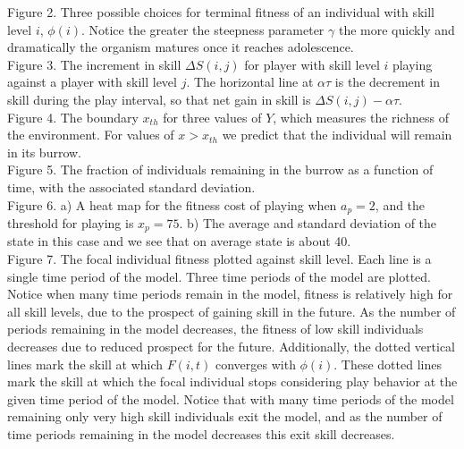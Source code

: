 \documentclass[12pt, letterpaper, fleqn]{article}
\begin{document}
%
%

%
Figure 2.
%
Three possible choices for terminal fitness of an individual with skill level $i$,  $\phi(i)$. 
%
Notice the greater the steepness parameter $\gamma$ the more quickly and dramatically the organism matures once it reaches adolescence. 
\\

%
%

%
Figure 3.
%
The increment in skill  $\Delta S(i,j)$ for player with skill level $i$ playing against a player with skill level $j$. 
%
The horizontal line at $\alpha \tau$ is the decrement in skill during the play interval, so that net gain in skill is $\Delta S(i,j) - \alpha \tau$.
\\

%
%

%
Figure 4.  
%
The boundary $x_{th}$ for three values of $Y$, which measures the richness of the environment.  
%
For values of $x>x_{th}$ we predict that the individual will remain in its burrow.
\\

%
%

%
Figure 5.
%
The fraction of individuals remaining in the burrow as a function of time, with the associated standard deviation.
\\

%
%

%
Figure 6.
%
a) A heat map for the fitness cost of playing when $a_p=2$, and the threshold for playing is $x_p=75$. 
%
b) The average and standard deviation of the state in this case and we see that on average state is about 40. 
\\

%
%

%
Figure 7.
%
The focal individual fitness plotted against skill level. 
%
Each line is a single time period of the model. 
%
Three time periods of the model are plotted. 
%
Notice when many time periods remain in the model, fitness is relatively high for all skill levels, due to the prospect of gaining skill in the future. 
%
As the number of periods remaining in the model decreases, the fitness of low skill individuals decreases due to reduced prospect for the future. 
%
Additionally, the dotted vertical lines mark the skill at which $F(i,t)$ converges with $\phi(i)$. 
%
These dotted lines mark the skill at which the focal individual stops considering play behavior at the given time period of the model. 
%
Notice that with many time periods of the model remaining only very high skill individuals exit the model, and as the number of time periods remaining in the model decreases this exit skill decreases.
\\
\end{document}
